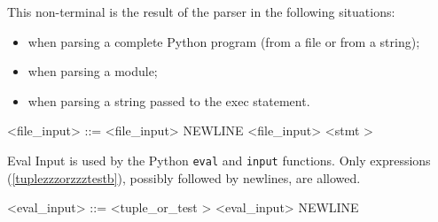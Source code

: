
\label{filezzzinputb}
This non-terminal is the result of the parser in the following situations:
\begin{itemize}
\item when parsing a complete Python program (from a file or from a string);
\item when parsing a module;
\item when parsing a string passed to the exec statement.
\end{itemize}


\begin{grammar}
<file_input> ::= \greeke %
	\alt <file_input> NEWLINE
	\alt <file_input> <stmt \myref[stmtb]>
\end{grammar}


\label{evalzzzinputb}
Eval Input is used by the Python \verb+eval+ and \verb+input+ functions.  Only expressions (\ref{tuplezzzorzzztestb}), possibly followed by newlines, are allowed. \\

\begin{grammar}
<eval_input> ::= <tuple_or_test \myref[tuplezzzorzzztestb]>
	\alt <eval_input> NEWLINE
\end{grammar}


